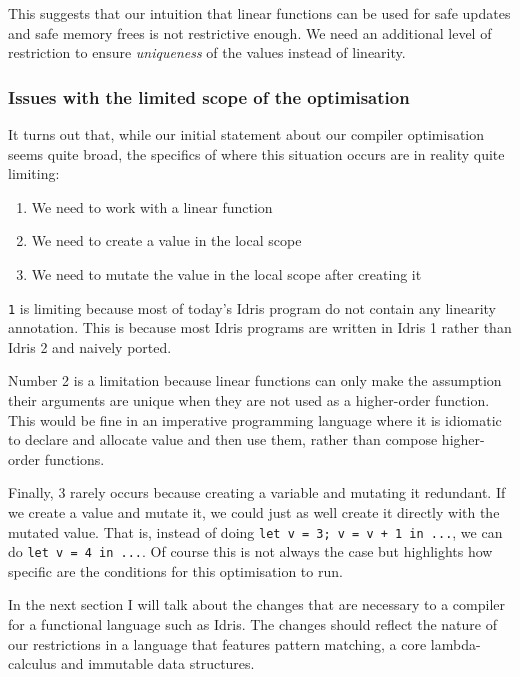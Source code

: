 \documentclass[
]{article}
\providecommand{\tightlist}{%
  \setlength{\itemsep}{0pt}\setlength{\parskip}{0pt}}
\begin{document}
This suggests that our intuition that linear functions can be used for
safe updates and safe memory frees is not restrictive enough. We need an
additional level of restriction to ensure \emph{uniqueness} of the
values instead of linearity.

\hypertarget{issues-with-the-limited-scope-of-the-optimisation}{%
\subsubsection{Issues with the limited scope of the
optimisation}\label{issues-with-the-limited-scope-of-the-optimisation}}

It turns out that, while our initial statement about our compiler
optimisation seems quite broad, the specifics of where this situation
occurs are in reality quite limiting:

\begin{enumerate}
\def\labelenumi{\arabic{enumi}.}
\tightlist
\item
  We need to work with a linear function
\item
  We need to create a value in the local scope
\item
  We need to mutate the value in the local scope after creating it
\end{enumerate}

\texttt{1} is limiting because most of today's Idris program do not
contain any linearity annotation. This is because most Idris programs
are written in Idris 1 rather than Idris 2 and naively ported.

Number 2 is a limitation because linear functions can only make the
assumption their arguments are unique when they are not used as a
higher-order function. This would be fine in an imperative programming
language where it is idiomatic to declare and allocate value and then
use them, rather than compose higher-order functions.

Finally, 3 rarely occurs because creating a variable and mutating it
redundant. If we create a value and mutate it, we could just as well
create it directly with the mutated value. That is, instead of doing
\texttt{let\ v\ =\ 3;\ v\textquotesingle{}\ =\ v\ +\ 1\ in\ ...}, we can
do \texttt{let\ v\ =\ 4\ in\ ...}. Of course this is not always the case
but highlights how specific are the conditions for this optimisation to
run.

In the next section I will talk about the changes that are necessary to
a compiler for a functional language such as Idris. The changes should
reflect the nature of our restrictions in a language that features
pattern matching, a core lambda-calculus and immutable data structures.
\end{document}
